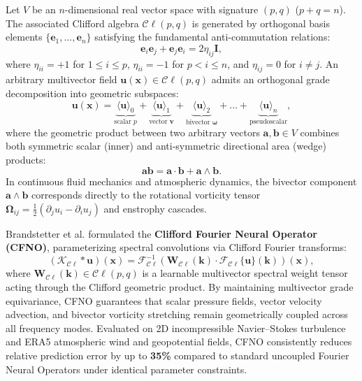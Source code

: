 Let $V$ be an $n$-dimensional real vector space with signature $(p, q)$ ($p+q=n$). The associated Clifford algebra $\mathcal{C}\ell(p, q)$ is generated by orthogonal basis elements $\{\mathbf{e}_1, \dots, \mathbf{e}_n\}$ satisfying the fundamental anti-commutation relations:
\begin{equation}
    \mathbf{e}_i \mathbf{e}_j + \mathbf{e}_j \mathbf{e}_i = 2 \eta_{ij} \mathbf{I},
    \label{eq:clifford_relation}
\end{equation}
where $\eta_{ii} = +1$ for $1 \le i \le p$, $\eta_{ii} = -1$ for $p < i \le n$, and $\eta_{ij} = 0$ for $i \ne j$. An arbitrary multivector field $\mathbf{u}(\mathbf{x}) \in \mathcal{C}\ell(p,q)$ admits an orthogonal grade decomposition into geometric subspaces:
\begin{equation}
    \mathbf{u}(\mathbf{x}) = \underbrace{\langle \mathbf{u} \rangle_0}_{\text{scalar } p} + \underbrace{\langle \mathbf{u} \rangle_1}_{\text{vector } \mathbf{v}} + \underbrace{\langle \mathbf{u} \rangle_2}_{\text{bivector } \boldsymbol{\omega}} + \dots + \underbrace{\langle \mathbf{u} \rangle_n}_{\text{pseudoscalar}},
    \label{eq:multivector_decomp}
\end{equation}
where the geometric product between two arbitrary vectors $\mathbf{a}, \mathbf{b} \in V$ combines both symmetric scalar (inner) and anti-symmetric directional area (wedge) products:
\begin{equation}
    \mathbf{a} \mathbf{b} = \mathbf{a} \cdot \mathbf{b} + \mathbf{a} \wedge \mathbf{b}.
\end{equation}
In continuous fluid mechanics and atmospheric dynamics, the bivector component $\mathbf{a} \wedge \mathbf{b}$ corresponds directly to the rotational vorticity tensor $\boldsymbol{\Omega}_{ij} = \frac{1}{2}(\partial_j u_i - \partial_i u_j)$ and enstrophy cascades.

Brandstetter et al. formulated the \textbf{Clifford Fourier Neural Operator (CFNO)}, parameterizing spectral convolutions via Clifford Fourier transforms:
\begin{equation}
    (\mathcal{K}_{\mathcal{C}\ell} * \mathbf{u})(\mathbf{x}) = \mathcal{F}_{\mathcal{C}\ell}^{-1} \left( \mathbf{W}_{\mathcal{C}\ell}(\mathbf{k}) \cdot \mathcal{F}_{\mathcal{C}\ell}\{\mathbf{u}\}(\mathbf{k}) \right)(\mathbf{x}),
    \label{eq:cfno_convolution}
\end{equation}
where $\mathbf{W}_{\mathcal{C}\ell}(\mathbf{k}) \in \mathcal{C}\ell(p,q)$ is a learnable multivector spectral weight tensor acting through the Clifford geometric product. By maintaining multivector grade equivariance, CFNO guarantees that scalar pressure fields, vector velocity advection, and bivector vorticity stretching remain geometrically coupled across all frequency modes. Evaluated on 2D incompressible Navier--Stokes turbulence and ERA5 atmospheric wind and geopotential fields, CFNO consistently reduces relative prediction error by up to \textbf{35\%} compared to standard uncoupled Fourier Neural Operators under identical parameter constraints.

